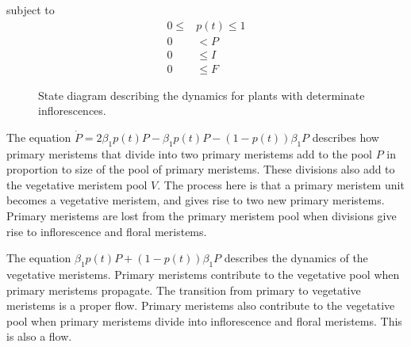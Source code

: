 \documentclass[12pt, oneside,titlepage]{article}   	%
\begin{document}
\noindent subject to
%
\begin{align}
0 \leq & p(t) \leq 1 \nonumber \\
0 & < P \nonumber \\
0 & \leq I \nonumber \\
0 & \leq F
\label{eqn:constraints-determinate}
\end{align}

\begin{figure}[hbt!]
\centering
{}
  \caption{State diagram describing the dynamics for plants with determinate inflorescences.}
  \label{fig:state-determinate}
\end{figure}

The equation $\dot{P}  = 2 \beta_1 p(t) P - \beta_1 p(t) P - ( 1-p(t) ) \beta_1 P $ describes how primary meristems that divide into two primary meristems add to the pool $P$ in proportion to size of the pool of primary meristems. These divisions also add to the vegetative meristem pool $V$. The process here is that a primary meristem unit becomes a vegetative meristem, and gives rise to two new primary meristems. Primary meristems are lost from the primary meristem pool when divisions give rise to inflorescence and floral meristems.

The equation $ \beta_1 p(t) P + ( 1-p(t) ) \beta_1 P $ describes the dynamics of the vegetative meristems. Primary meristems contribute to the vegetative pool when primary meristems propagate. The transition from primary to vegetative meristems is a proper flow. Primary meristems also contribute to the vegetative pool when primary meristems divide into inflorescence and floral meristems. This is also a flow.
 
\end{document}

